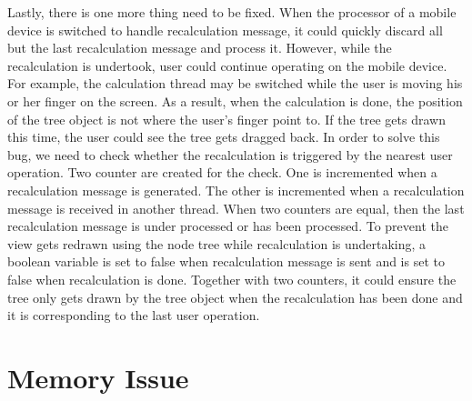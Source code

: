 \documentclass[MSc]{icldt}
\begin{document}
Lastly, there is one more thing need to be fixed. When the processor of a mobile device is switched to handle recalculation message, it could quickly discard all but the last recalculation message and process it. However, while the recalculation is undertook, user could continue operating on the mobile device. For example, the calculation thread may be switched while the user is moving his or her finger on the screen. As a result, when the calculation is done, the position of the tree object is not where the user's finger point to. If the tree gets drawn this time, the user could see the tree gets dragged back. In order to solve this bug, we need to check whether the recalculation is triggered by the nearest user operation. Two counter are created for the check. One is incremented when a recalculation message is generated. The other is incremented when a recalculation message is received in another thread. When two counters are equal, then the last recalculation message is under processed or has been processed. To prevent the view gets redrawn using the node tree while recalculation is undertaking, a boolean variable is set to false when recalculation message is sent and is set to false when recalculation is done. Together with two counters, it could ensure the tree only gets drawn by the tree object when the recalculation has been done and it is corresponding to the last user operation. 





\chapter{Memory Issue}
\end{document}
